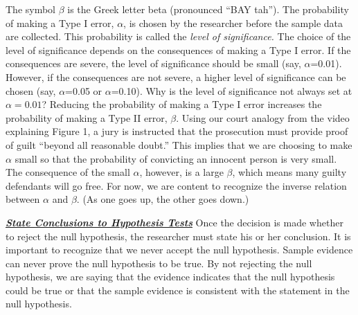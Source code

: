 \documentclass{report}
\begin{document}
    \bigbreak \noindent 
    The symbol $\beta $ is the Greek letter beta (pronounced “BAY tah”). The probability of making a Type I error, $\alpha $, is chosen by the researcher before the sample data are collected. This probability is called the \textit{level of significance.}
    \bigbreak \noindent 
    The choice of the level of significance depends on the consequences of making a Type I error. If the consequences are severe, the level of significance should be small (say, $\alpha$=0.01). However, if the consequences are not severe, a higher level of significance can be chosen (say, $\alpha $=0.05 or $\alpha $=0.10).
    \bigbreak \noindent 
    Why is the level of significance not always set at $\alpha=0.01$? Reducing the probability of making a Type I error increases the probability of making a Type II error, $\beta$. Using our court analogy from the video explaining Figure 1, a jury is instructed that the prosecution must provide proof of guilt “beyond all reasonable doubt.” This implies that we are choosing to make $\alpha$ small so that the probability of convicting an innocent person is very small. The consequence of the small $\alpha$, however, is a large $\beta$, which means many guilty defendants will go free. For now, we are content to recognize the inverse relation between $\alpha$ and $\beta$. (As one goes up, the other goes down.)

    \bigbreak \noindent \bigbreak \noindent 
    \textbf{\textit{\underline{State Conclusions to Hypothesis Tests}}}
    \bigbreak \noindent 
    Once the decision is made whether to reject the null hypothesis, the researcher must state his or her conclusion. It is important to recognize that we never accept the null hypothesis. 
    \bigbreak \noindent 
    Sample evidence can never prove the null hypothesis to be true. By not rejecting the null hypothesis, we are saying that the evidence indicates that the null hypothesis could be true or that the sample evidence is consistent with the statement in the null hypothesis.

    \pagebreak 
\end{document}
